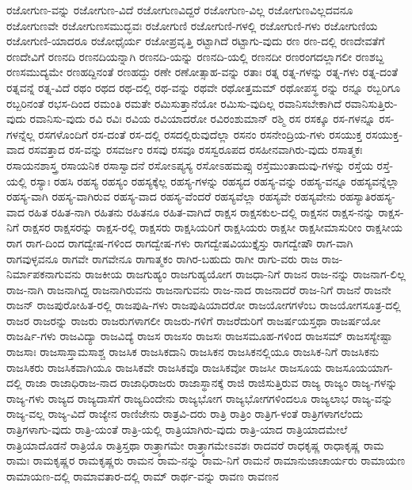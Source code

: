 {ರಜೋಗುಣ-ವನ್ನು
ರಜೋಗುಣ-ವಿದೆ
ರಜೋಗುಣವಿದ್ದರೆ
ರಜೋಗುಣ-ವಿಲ್ಲ
ರಜೋಗುಣವಿಲ್ಲದವನೂ
ರಜೋಗುಣವೇ
ರಜೋಗುಣಸಮುದ್ಭವಃ
ರಜೋಗುಣಿ
ರಜೋಗುಣಿ-ಗಳಲ್ಲಿ
ರಜೋಗುಣಿ-ಗಳು
ರಜೋಗುಣಿಯ
ರಜೋಗುಣಿ-ಯಾದರೂ
ರಜೋಧೈರ್ಯ
ರಜೋಪ್ರವೃತ್ತಿ
ರಟ್ಟಾಗಿದೆ
ರಟ್ಟಾಗು-ವುದು
ರಣ
ರಣ-ದಲ್ಲಿ
ರಣದೇವತೆಗೆ
ರಣದೇವಿಗೆ
ರಣನದಿ
ರಣನದಿಯನ್ನಾಗಿ
ರಣನದಿ-ಯನ್ನು
ರಣನದಿ-ಯಲ್ಲಿ
ರಣನದೀ
ರಣರಂಗದಲ್ಲಾಗಲೀ
ರಣಶಬ್ದ
ರಣಸಮುದ್ಯಮೇ
ರಣಹದ್ದಿನಂತೆ
ರಣಹದ್ದು
ರಣೇ
ರಣೋತ್ಸಾಹ-ವನ್ನು
ರತಾಃ
ರತ್ನ
ರತ್ನ-ಗಳನ್ನು
ರತ್ನ-ಗಳು
ರತ್ನ-ದಂತೆ
ರತ್ನವನ್ನೆ
ರತ್ನ-ವಿದೆ
ರಥಂ
ರಥದ
ರಥ-ದಲ್ಲಿ
ರಥ-ವನ್ನು
ರಥವೇ
ರಥೋತ್ತಮಮ್
ರಥೋಪಸ್ಥ
ರನ್ನು
ರನ್ನೂ
ರಬ್ಬರಿಗೂ
ರಬ್ಬರಿನಂತೆ
ರಭಸ-ದಿಂದ
ರಮಂತಿ
ರಮತೇ
ರಮಿಸುತ್ತಾನೆಯೋ
ರಮಿಸು-ವುದಿಲ್ಲ
ರವಾನಿಸಬೇಕಾಗಿದೆ
ರವಾನಿಸುತ್ತಿರು-ವುದು
ರವಾನಿಸು-ವುದು
ರವಿ
ರವಿಃ
ರವಿಯ
ರವಿಯಾದರೋ
ರವಿರಂಶುಮಾನ್
ರಶ್ಮಿ
ರಸ
ರಸಕ್ಕೂ
ರಸ-ಗಳನ್ನೂ
ರಸ-ಗಳನ್ನೆಲ್ಲ
ರಸಗಳೊಂದಿಗೆ
ರಸ-ದಂತೆ
ರಸ-ದಲ್ಲಿ
ರಸದಲ್ಲಿರುವುದೆಲ್ಲಾ
ರಸನಂ
ರಸನೇಂದ್ರಿಯ-ಗಳು
ರಸಯುಕ್ತ
ರಸಯುಕ್ತ-ವಾದ
ರಸವತ್ತಾದ
ರಸ-ವನ್ನು
ರಸವರ್ಜಂ
ರಸವು
ರಸವೂ
ರಸಸ್ವರೂಪದ
ರಸಹೀನವಾಗಿರು-ವುದು
ರಸಾತ್ಮಕಃ
ರಸಾಯನಶಾಸ್ತ್ರ
ರಸಾಯನಿಕ
ರಸಾಸ್ವಾದನೆ
ರಸೋಽಪ್ಯಸ್ಯ
ರಸೋಽಹಮಪ್ಸು
ರಸ್ತೆಮುಂತಾದುವು-ಗಳನ್ನು
ರಸ್ತೆಯ
ರಸ್ತೆ-ಯಲ್ಲಿ
ರಸ್ಯಾಃ
ರಹಸಿ
ರಹಸ್ಯ
ರಹಸ್ಯಂ
ರಹಸ್ಯಕ್ಕೆಲ್ಲ
ರಹಸ್ಯ-ಗಳನ್ನು
ರಹಸ್ಯದ
ರಹಸ್ಯ-ವನ್ನು
ರಹಸ್ಯ-ವನ್ನೂ
ರಹಸ್ಯವನ್ನೆಲ್ಲಾ
ರಹಸ್ಯ-ವಾಗಿ
ರಹಸ್ಯ-ವಾಗಿರುವ
ರಹಸ್ಯ-ವಾದ
ರಹಸ್ಯ-ವೆಂದರೆ
ರಹಸ್ಯವೆಲ್ಲಾ
ರಹಸ್ಯವೇ
ರಹಸ್ಯವೇನು
ರಹಸ್ಯಾತಿರಹಸ್ಯ-ವಾದ
ರಹಿತ
ರಹಿತ-ನಾಗಿ
ರಹಿತನು
ರಹಿತನೂ
ರಹಿತ-ವಾಗಿದೆ
ರಾಕ್ಷಸ
ರಾಕ್ಷಸಕುಲ-ದಲ್ಲಿ
ರಾಕ್ಷಸನ
ರಾಕ್ಷಸ-ನನ್ನು
ರಾಕ್ಷಸ-ನಿಗೆ
ರಾಕ್ಷಸರ
ರಾಕ್ಷಸರನ್ನು
ರಾಕ್ಷಸ-ರಲ್ಲಿ
ರಾಕ್ಷಸರು
ರಾಕ್ಷಸಿಯರಿಗೆ
ರಾಕ್ಷಸಿಯರು
ರಾಕ್ಷಸೀ
ರಾಕ್ಷಸೀಮಾಸುರೀಂ
ರಾಕ್ಷಸೀಯ
ರಾಗ
ರಾಗ-ದಿಂದ
ರಾಗದ್ವೇಷ-ಗಳಿಂದ
ರಾಗದ್ವೇಷ-ಗಳು
ರಾಗದ್ವೇಷವಿಯುಕ್ತೈಸ್ತು
ರಾಗದ್ವೇಷೌ
ರಾಗ-ವಾಗಿ
ರಾಗವುಳ್ಳವನೂ
ರಾಗವೇ
ರಾಗವೇನೂ
ರಾಗಾತ್ಮಕಂ
ರಾಗಿರ-ಬಹುದು
ರಾಗೀ
ರಾಗು-ವರು
ರಾಜ
ರಾಜ-ನಿರ್ಮಾಪಕನಾಗುವನು
ರಾಜಕೀಯ
ರಾಜಗುಹ್ಯಂ
ರಾಜಗುಹ್ಯಯೋಗ
ರಾಜಧಾ-ನಿಗೆ
ರಾಜನ
ರಾಜ-ನನ್ನು
ರಾಜನಾಗ-ಲಿಲ್ಲ
ರಾಜ-ನಾಗಿ
ರಾಜನಾಗಿದ್ದ
ರಾಜನಾಗಿರುವನು
ರಾಜನಾಗುವನು
ರಾಜ-ನಾದ
ರಾಜನಾದರೆ
ರಾಜ-ನಿಗೆ
ರಾಜನೆ
ರಾಜನೇ
ರಾಜನ್
ರಾಜಪುರೋಹಿತ-ರಲ್ಲಿ
ರಾಜಪುಷಿ-ಗಳು
ರಾಜಪುಷಿಯಾದರೋ
ರಾಜಯೋಗಗಳೆಂಬ
ರಾಜಯೋಗಸೂತ್ರ-ದಲ್ಲಿ
ರಾಜರ
ರಾಜರನ್ನು
ರಾಜರು
ರಾಜರುಗಳಾಗಲೀ
ರಾಜರು-ಗಳಿಗೆ
ರಾಜರೆದುರಿಗೆ
ರಾಜರ್ಷಯಸ್ತಥಾ
ರಾಜರ್ಷಯೋ
ರಾಜರ್ಷಿ-ಗಳು
ರಾಜವಿದ್ಯಾ
ರಾಜವಿದ್ಯೆ
ರಾಜಸ
ರಾಜಸಂ
ರಾಜಸಃ
ರಾಜಸಮೂಹ-ಗಳಿಂದ
ರಾಜಸಮ್
ರಾಜಸಸ್ಯೇಷ್ಟಾ
ರಾಜಸಾಃ
ರಾಜಸಾಸ್ತಾಮಸಾಶ್ಚ
ರಾಜಸಿಕ
ರಾಜಸಿಕದಾನಿ
ರಾಜಸಿಕನ
ರಾಜಸಿಕನಲ್ಲಿಯೂ
ರಾಜಸಿಕ-ನಿಗೆ
ರಾಜಸಿಕನು
ರಾಜಸಿಕರು
ರಾಜಸಿಕವಾಗಿಯೂ
ರಾಜಸಿಕವೇ
ರಾಜಸಿಕವೊ
ರಾಜಸಿಕವೋ
ರಾಜಸೀ
ರಾಜಸೂಯ
ರಾಜಸೂಯಯಾಗ-ದಲ್ಲಿ
ರಾಜಾ
ರಾಜಾಧಿರಾಜ-ನಾದ
ರಾಜಾಧಿರಾಜರು
ರಾಜಾಸ್ಥಾನಕ್ಕೆ
ರಾಜಿ
ರಾಜಿಸುತ್ತಿರುವ
ರಾಜ್ಯ
ರಾಜ್ಯಂ
ರಾಜ್ಯ-ಗಳನ್ನು
ರಾಜ್ಯ-ಗಳು
ರಾಜ್ಯದ
ರಾಜ್ಯದಾಸೆಗೆ
ರಾಜ್ಯದಿಂದೇನು
ರಾಜ್ಯಭೋಗ
ರಾಜ್ಯಭೋಗಗಳಿಂದಲೂ
ರಾಜ್ಯಲಾಭ
ರಾಜ್ಯ-ವನ್ನು
ರಾಜ್ಯ-ವಲ್ಲ
ರಾಜ್ಯ-ವಿದೆ
ರಾಜ್ಯೇನ
ರಾಣಿಜೇನು
ರಾತ್ರವಿ-ದರು
ರಾತ್ರಿ
ರಾತ್ರಿಂ
ರಾತ್ರಿಗ-ಳಂತೆ
ರಾತ್ರಿಗಳಾಗಲೆಂದು
ರಾತ್ರಿಗಳಾಗು-ವುದು
ರಾತ್ರಿ-ಯಂತೆ
ರಾತ್ರಿ-ಯಲ್ಲಿ
ರಾತ್ರಿಯಾಗಿರು-ವುದು
ರಾತ್ರಿ-ಯಾದ
ರಾತ್ರಿಯಾದಮೇಲೆ
ರಾತ್ರಿಯಾದೊಡನೆ
ರಾತ್ರಿಯೊ
ರಾತ್ರಿಸ್ತಥಾ
ರಾತ್ರ್ಯಾಗಮೇ
ರಾತ್ರ್ಯಾಗಮೇಽವಶಃ
ರಾದವರೆ
ರಾಧಕೃಷ್ಣ
ರಾಧಾಕೃಷ್ಣ
ರಾಮ
ರಾಮಃ
ರಾಮಕೃಷ್ಣರ
ರಾಮಕೃಷ್ಣರು
ರಾಮನ
ರಾಮ-ನನ್ನು
ರಾಮ-ನಿಗೆ
ರಾಮನೆ
ರಾಮಾನುಜಾಚಾರ್ಯರು
ರಾಮಾಯಣ
ರಾಮಾಯಣ-ದಲ್ಲಿ
ರಾಮಾವತಾರ-ದಲ್ಲಿ
ರಾಮ್
ರಾರ್ಥ-ವನ್ನು
ರಾವಣ
ರಾವಣನ
}
